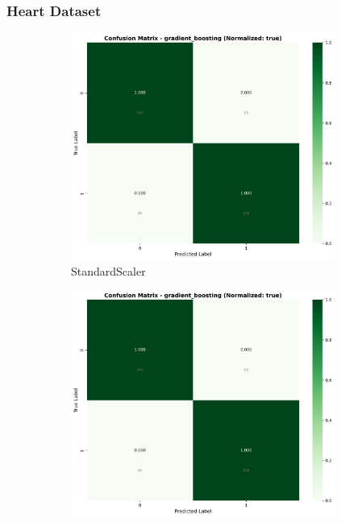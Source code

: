 \FloatBarrier

\subsubsection{Heart Dataset}\label{subsubsec:gb-heart}

\begin{figure}[H]
\centering
\begin{subfigure}[b]{0.31\textwidth}\centering
\includegraphics[width=0.95\textwidth]{Result/heart_dataset/confusion_matrices/gradient_boosting_numeric_dataset_StandardScaler.png}
\caption{StandardScaler}\label{fig:gb_heart_cm_standard}
\end{subfigure}\hfill
\begin{subfigure}[b]{0.31\textwidth}\centering
\includegraphics[width=0.95\textwidth]{Result/heart_dataset/confusion_matrices/gradient_boosting_numeric_dataset_MinMaxScaler.png}

\end{subfigure}
\end{figure}
